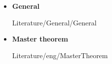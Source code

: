 \begin{frame}{\LectureFurtherLiterature}
  \begin{itemize}
    \item
      \textbf{General}
      \begin{btSect}{Literature/General/General}
        \btPrintAll
      \end{btSect}
  \end{itemize}
\end{frame}


\begin{frame}{\LectureFurtherLiterature}
  \begin{itemize}
    \item
      \textbf{Master theorem}
      \begin{btSect}{Literature/eng/MasterTheorem}
        \btPrintAll
      \end{btSect}
  \end{itemize}
\end{frame}